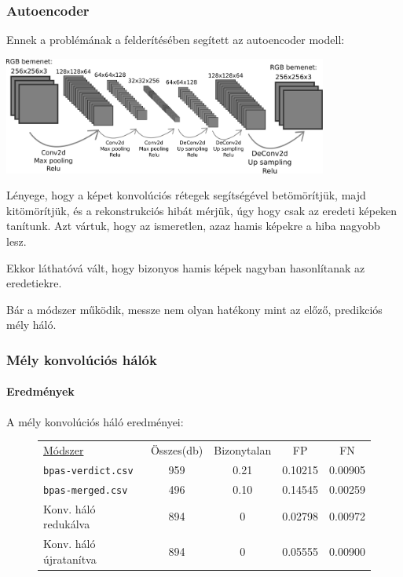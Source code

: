 \documentclass[11pt]{beamer}
\begin{document}
\begin{frame}
	\frametitle{Autoencoder}
	
	Ennek a problémának a felderítésében segített az autoencoder modell:
	
	\includegraphics[width=0.8\textwidth]{autoencoder-network-modell.pdf}

	Lényege, hogy a képet konvolúciós rétegek segítségével betömörítjük, majd kitömörítjük, és a rekonstrukciós hibát mérjük, úgy hogy csak az eredeti képeken tanítunk. Azt vártuk, hogy az ismeretlen, azaz hamis képekre a hiba nagyobb lesz.
	
	Ekkor láthatóvá vált, hogy bizonyos hamis képek nagyban hasonlítanak az eredetiekre.
	
	Bár a módszer működik, messze nem olyan hatékony mint az előző, predikciós mély háló.
	
	



\end{frame}


\begin{frame}
	\frametitle{Mély konvolúciós hálók}
	\framesubtitle{Eredmények}

	A mély konvolúciós háló eredményei:
	
	\begin{figure} [h!]
		\centering
		\begin{tabular}{ l c c c c  }
			\underline{Módszer} 			& Összes(db) 	& Bizonytalan	& FP	& FN \\
			\texttt{bpas-verdict.csv} 	& 959 			& 0.21			& 0.10215 	& 0.00905 	\\
			\texttt{bpas-merged.csv}  	& 496			& 0.10			& 0.14545 	& 0.00259   \\
			
			\hline
			Konv. háló redukálva\footnotemark 	& 894			& 0				& 0.02798	& 0.00972	\\
			Konv. háló újratanítva& 894			& 0				& 0.05555	& 0.00900	\\
			
			
		\end{tabular} 
		
	\end{figure}

\end{frame}
\end{document}

